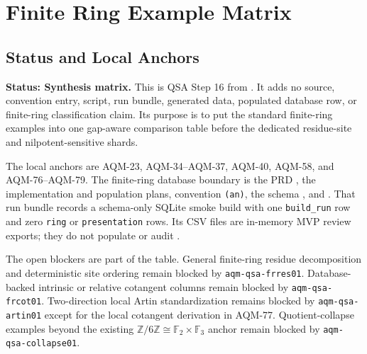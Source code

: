 
\section{Finite Ring Example Matrix}
\label{sec:qsa-finite-ring-example-matrix}

\subsection{Status and Local Anchors}

\textbf{Status: Synthesis matrix.}  This is QSA Step 16 from
.  It adds no source,
convention entry, script, run bundle, generated data, populated database row,
or finite-ring classification claim.  Its purpose is to put the standard
finite-ring examples into one gap-aware comparison table before the dedicated
residue-site and nilpotent-sensitive shards.

The local anchors are AQM-23, AQM-34--AQM-37, AQM-40, AQM-58, and
AQM-76--AQM-79.  The finite-ring database boundary is the PRD
, the implementation and
population plans, convention \texttt{(an)}, the schema
, and
.  That run bundle
records a schema-only SQLite smoke build with one \texttt{build\_run} row and
zero \texttt{ring} or \texttt{presentation} rows.  Its CSV files are
in-memory MVP review exports; they do not populate or audit
.

The open blockers are part of the table.  General finite-ring residue
decomposition and deterministic site ordering remain blocked by
\texttt{aqm-qsa-frres01}.  Database-backed intrinsic or relative cotangent
columns remain blocked by \texttt{aqm-qsa-frcot01}.  Two-direction local Artin
standardization remains blocked by \texttt{aqm-qsa-artin01} except for the
local cotangent derivation in AQM-77.  Quotient-collapse examples beyond the
existing \(\mathbb Z/6\mathbb Z\cong\mathbb F_2\times\mathbb F_3\) anchor
remain blocked by \texttt{aqm-qsa-collapse01}.

